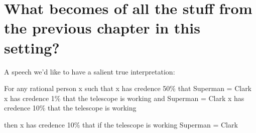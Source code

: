 \documentclass[If.tex]{subfiles}
\begin{document}
\section{What becomes of all the stuff from the previous chapter in this setting?}

A speech we'd like to have a salient true interpretation:

For any rational person x such that
	x has credence 50\% that Superman = Clark
	x has credence 1\% that the telescope is working and Superman = Clark
	x has credence 10\% that the telescope is working

then x has credence 10\% that if the telescope is working Superman = Clark
\end{document}
